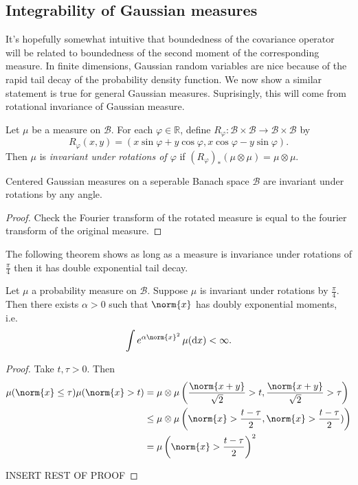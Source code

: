 \documentclass[fontsize=12pt, DIV=12]{scrreprt}
\newcommand{\R}{\mathbb R}
\newcommand{\calB}{\mathcal B}
\newcommand{\dif}[1]{\text{d} #1}
\renewcommand{\phi}{\varphi}
\begin{document}
\subsection{Integrability of Gaussian measures}

It's hopefully somewhat intuitive that boundedness of the covariance operator will be related to boundedness of the second moment of the corresponding measure. In finite dimensions, Gaussian random variables are nice because of the rapid tail decay of the probability density function. We now show a similar statement is true for general Gaussian measures. Suprisingly, this will come from rotational invariance of Gaussian measure. 

\begin{defn}
	Let $\mu$ be a measure on $\calB$. For each $\phi \in \R$, define $R_{\phi}: \calB \times \calB \to \calB \times \calB$ by
	\begin{equation}
		R_{\phi}(x, y) = (x \sin \phi + y \cos \phi, x \cos \phi - y \sin \phi).
	\end{equation}
	Then $\mu$ is \emph{invariant under rotations of $\phi$} if $(R_{\phi})_* (\mu \otimes \mu) = \mu \otimes \mu$.
\end{defn}

\begin{prop}
	Centered Gaussian measures on a seperable Banach space $\calB$ are invariant under rotations by any angle.
\end{prop}
\begin{proof}
	Check the Fourier transform of the rotated measure is equal to the fourier transform of the original measure.
\end{proof}

The following theorem shows as long as a measure is invariance under rotations of $\frac{\pi}{4}$ then it has double exponential tail decay.
\begin{theorem}[Fernique]
	Let $\mu$ a probability measure on $\calB$. Suppose $\mu$ is invariant under rotations by $\frac{\pi}{4}$. Then there exists $\alpha > 0$ such that $\norm{x}$ has doubly exponential moments, i.e.\
	\begin{equation}
		\int e^{\alpha \norm{x}^2} \, \mu(\dif x) < \infty.
	\end{equation}
\end{theorem}
\begin{proof}
	Take $t, \tau > 0$. Then
	\begin{align}
		\mu(\norm{x} \leq \tau) \mu(\norm{x} > t)
		&= \mu \otimes \mu\left( \frac{\norm{x + y}}{\sqrt{2}} > t, \frac{\norm{x+y}}{\sqrt{2}} > \tau \right) \\
		&\leq \mu \otimes \mu \left(\norm{x} > \frac{t - \tau}{2}, \norm{x} > \frac{t - \tau}{2}) \right) \\
		&= \mu\left(\norm{x} > \frac{t - \tau}{2}\right)^2
	\end{align}

	INSERT REST OF PROOF
\end{proof}
\end{document}
